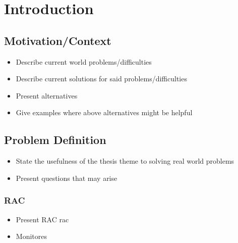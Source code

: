 
%

\chapter{Introduction}
\label{cha:introduction}

\section{Motivation/Context}
\label{sec:motivation_context}

\begin{itemize}
    \item Describe current world problems/difficulties
    \item Describe current solutions for said problems/difficulties
    \item Present alternatives
    \item Give examples where above alternatives might be helpful
\end{itemize}

\section{Problem Definition}
\label{sub:problem_definition}

\begin{itemize}
    \item State the usefulness of the thesis theme to solving real world problems
    \item Present questions that may arise
\end{itemize}

\subsection{RAC}
\label{sub:rac}

\begin{itemize}
    \item Present RAC \gls{rac}
\end{itemize}

\begin{itemize}
    \item Monitores
\end{itemize}

